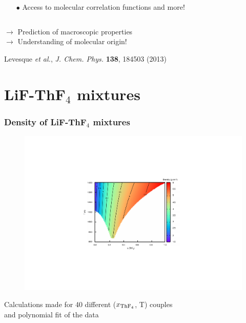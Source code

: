 \documentclass{beamer}
\begin{document}
\begin{frame}
\begin{columns}
\begin{column}{6cm}
        \begin{itemize}
           \item[$\bullet$] Access to molecular correlation functions and more!
        \end{itemize}
      \end{column}
   \end{columns}
\begin{center}
$\rightarrow$ Prediction of macroscopic properties\\
$\rightarrow$ Understanding of molecular origin!
\end{center}

   \scriptsize{Levesque {\it et al.}, {\it J. Chem. Phys.} {\bf 138}, 184503 (2013)}
\end{frame}








\section{LiF-ThF$_4$ mixtures}

\begin{frame}
   \frametitle{Density of LiF-ThF$_4$ mixtures}
   \begin{figure}
   \includegraphics[width=.6\textwidth]{density}
   \end{figure}

   Calculations made for 40 different ($x_{\rm ThF_4}$, T) couples\\ and polynomial fit of the data
   
\end{frame}
\end{document}
